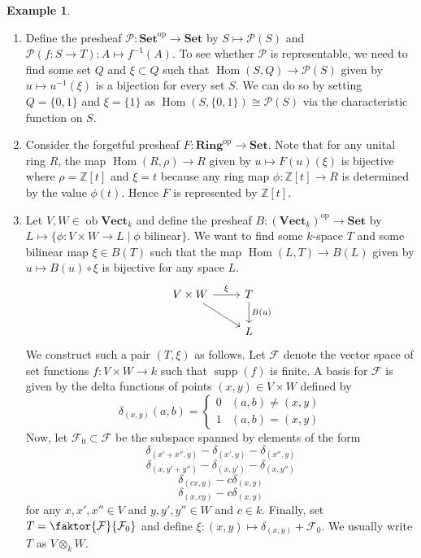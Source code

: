 \documentclass[10pt,letterpaper,cm]{nupset}
\theoremstyle{definition}
\newtheorem{exmp}[definition]{Example}
\theoremstyle{theorem}
\theoremstyle{remark}
\renewcommand{\P}{\mathcal P}
\newcommand{\Z}{\mathbb Z}
\newcommand{\1}{\mathbf{1}}
\newcommand{\0}{\vec 0}
\DeclareMathOperator{\op}{op}
\DeclareMathOperator{\ob}{ob}
\DeclareMathOperator{\Hom}{Hom}
\DeclareMathOperator{\supp}{supp}
\begin{document}
\begin{exmp} $ $
\begin{enumerate}
\item Define the presheaf $\P : \mathbf{Set}^{\op} \to \mathbf{Set}$ by $S \mapsto \P(S)$ and $\P(f : S \to T) : A \mapsto f^{-1}(A).$ To see whether $\P$ is representable, we need to find some set $Q$ and $\xi \subset Q$ such that $\Hom(S, Q) \to \P(S)$ given by $u \mapsto u^{-1}(\xi)$ is a bijection for every set $S$. We can do so by setting $Q = \{0, 1\}$ and $\xi = \{1\}$ as $\Hom(S, \{0, 1\}) \cong \P(S)$ via the characteristic function on $S$.
\item Consider the forgetful presheaf $F: \mathbf{Ring}^{\op} \to \mathbf{Set}$. Note that for any unital ring $R$, the map $\Hom(R, \rho) \to R$ given by $u \mapsto F(u)(\xi)$ is bijective where $\rho = \Z[t]$ and $\xi = t$ because any ring map $\phi : \Z[t] \to R$ is determined by the value $\phi(t)$. Hence $F$ is represented by $\Z[t]$.
\item Let $V, W \in \ob \mathbf{Vect}_k$ and define the presheaf $B: (\mathbf{Vect}_k)^{\op} \to \mathbf{Set}$ by $L \mapsto \{ \phi : V \times W \to L \mid \phi$ bilinear$\}$. We want to find some $k$-space $T$ and some bilinear map $\xi \in B(T)$ such that the map $\Hom(L, T) \to B(L)$ given by $u \mapsto B(u) \circ \xi$ is bijective for any space $L$. 
\[
\begin{tikzcd}
V \times W \arrow[r, "\xi"] \arrow[rd] & T \arrow[d, "B(u)"] \\
 & L
\end{tikzcd}
\]
We construct such a pair $(T, \xi)$ as follows. Let $\mathcal{F}$ denote the vector space of set functions $f: V \times W \to k$ such that $\supp(f)$ is finite. A basis for $\mathcal{F}$ is given by the delta functions of points $(x, y) \in V \times W$ defined by
\[ \delta_{(x,y)}(a, b) = \begin{cases}
0 & (a,b) \ne (x,y) \\
1 & (a, b) = (x,y)
\end{cases}
\]
Now, let $\mathcal{F}_0 \subset \mathcal{F}$ be the subspace spanned by elements of the form
$$ \delta_{(x' + x'', y)} - \delta_{(x', y)} - \delta_{(x'', y)} $$
$$ \delta_{(x, y' + y'')} - \delta_{(x, y')} - \delta_{(x, y'')} $$
$$ \delta_{(cx, y)} - c\delta_{(x,y)}  $$
$$\delta_{(x,cy)} -c \delta_{(x,y)} $$
for any $x, x', x'' \in V$ and $y, y', y'' \in W$ and $c \in k$. Finally, set $T = \faktor{\mathcal{F}}{\mathcal{F}_0}$ and define $\xi : (x, y) \mapsto \delta_{(x,y)} + \mathcal{F}_0$. We usually write $T$ as $V \otimes_k W$.
\end{enumerate}
\end{exmp}
\end{document}
